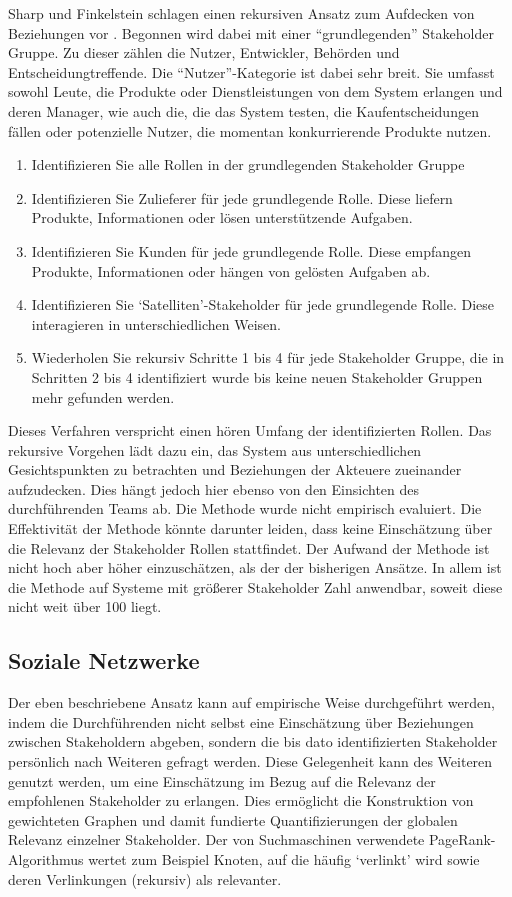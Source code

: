 Sharp und Finkelstein schlagen einen rekursiven Ansatz zum Aufdecken von Beziehungen vor \cite{sharp}. Begonnen wird dabei mit einer ``grundlegenden'' Stakeholder Gruppe. Zu dieser zählen die Nutzer, Entwickler, Behörden und Entscheidungtreffende. Die ``Nutzer''-Kategorie ist dabei sehr breit. Sie umfasst sowohl Leute, die Produkte oder Dienstleistungen von dem System erlangen und deren Manager, wie auch die, die das System testen, die Kaufentscheidungen fällen oder
potenzielle Nutzer, die momentan konkurrierende Produkte nutzen.

\begin{enumerate}
  \item Identifizieren Sie alle Rollen in der grundlegenden Stakeholder Gruppe
  \item Identifizieren Sie Zulieferer für jede grundlegende Rolle. Diese liefern Produkte, Informationen oder lösen unterstützende Aufgaben.
  \item Identifizieren Sie Kunden für jede grundlegende Rolle. Diese empfangen Produkte, Informationen oder hängen von gelösten Aufgaben ab.
  \item Identifizieren Sie `Satelliten'-Stakeholder für jede grundlegende Rolle. Diese interagieren in unterschiedlichen Weisen.
  \item Wiederholen Sie rekursiv Schritte 1 bis 4 für jede Stakeholder Gruppe, die in Schritten 2 bis 4 identifiziert wurde bis keine neuen Stakeholder Gruppen mehr gefunden werden.
\end{enumerate}

Dieses Verfahren verspricht einen hören Umfang der identifizierten Rollen. Das rekursive Vorgehen lädt dazu ein, das System aus unterschiedlichen Gesichtspunkten zu betrachten und Beziehungen der Akteuere zueinander aufzudecken. Dies hängt jedoch hier ebenso von den Einsichten des durchführenden Teams ab. Die Methode wurde nicht empirisch evaluiert. Die Effektivität der Methode könnte darunter leiden, dass keine Einschätzung über die Relevanz der Stakeholder Rollen stattfindet.
Der Aufwand der Methode ist nicht hoch aber höher einzuschätzen, als der der bisherigen Ansätze. In allem ist die Methode auf Systeme mit größerer Stakeholder Zahl anwendbar, soweit diese nicht weit über 100 liegt.

\subsection{Soziale Netzwerke}

Der eben beschriebene Ansatz kann auf empirische Weise durchgeführt werden, indem die Durchführenden nicht selbst eine Einschätzung über Beziehungen zwischen Stakeholdern abgeben, sondern die bis dato identifizierten Stakeholder persönlich nach Weiteren gefragt werden. Diese Gelegenheit kann des Weiteren genutzt werden, um eine Einschätzung im Bezug auf die Relevanz der empfohlenen Stakeholder zu erlangen. Dies ermöglicht die Konstruktion von gewichteten Graphen und damit
fundierte Quantifizierungen der globalen Relevanz einzelner Stakeholder. Der von Suchmaschinen verwendete PageRank-Algorithmus wertet zum Beispiel Knoten, auf die häufig `verlinkt' wird sowie deren Verlinkungen (rekursiv) als relevanter. \cite{stakenet}

